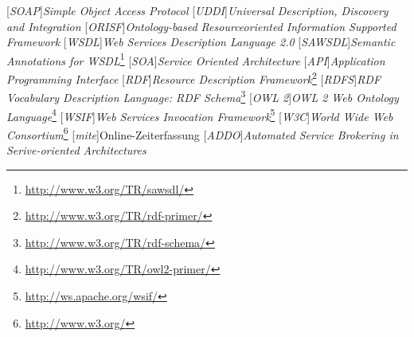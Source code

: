 
[\emph{SOAP}]{\emph{Simple Object Access Protocol}}
[\emph{UDDI}]{\emph{Universal Description, Discovery and Integration}}
[\emph{ORISF}]{\emph{Ontology-based Resourceoriented Information Supported Framework}}
[\emph{WSDL}]{\emph{Web Services Description Language 2.0}}
[\emph{SAWSDL}]{\emph{Semantic Annotations for WSDL}\footnote{\url{http://www.w3.org/TR/sawsdl/}}}
[\emph{SOA}]{\emph{Service Oriented Architecture}}
[\emph{API}]{\emph{Application Programming Interface}}
[\emph{RDF}]{\emph{Resource Description Framework}\footnote{\url{http://www.w3.org/TR/rdf-primer/}}}
[\emph{RDFS}]{\emph{RDF Vocabulary Description Language: RDF Schema}\footnote{\url{http://www.w3.org/TR/rdf-schema/}}}
[\emph{OWL 2}]{\emph{OWL 2 Web Ontology Language}\footnote{\url{http://www.w3.org/TR/owl2-primer/}}}
[\emph{WSIF}]{\emph{Web Services Invocation Framework}\footnote{\url{http://ws.apache.org/wsif/}}}
[\emph{W3C}]{\emph{World Wide Web Consortium}\footnote{\url{http://www.w3.org/}}}
[\emph{mite}]{Online-Zeiterfassung}
[\emph{ADDO}]{\emph{Automated Service Brokering in Serive-oriented Architectures}}
